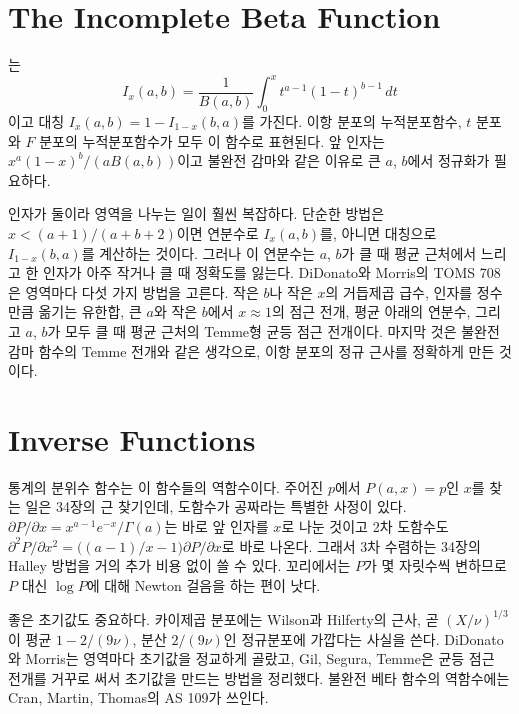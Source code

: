 \section{The Incomplete Beta Function}
\label{sec:incomplete-beta}

는
\[
I_x(a,b)=\frac1{B(a,b)}\int_0^xt^{a-1}(1-t)^{b-1}\,dt
\]
이고 대칭 $I_x(a,b)=1-I_{1-x}(b,a)$를 가진다. 이항 분포의 누적분포함수, $t$ 분포와 $F$ 분포의 누적분포함수가 모두 이 함수로 표현된다. 앞 인자는 $x^a(1-x)^b/(aB(a,b))$이고 불완전 감마와 같은 이유로 큰 $a$, $b$에서 정규화가 필요하다.

인자가 둘이라 영역을 나누는 일이 훨씬 복잡하다. 단순한 방법은 $x<(a+1)/(a+b+2)$이면 연분수로 $I_x(a,b)$를, 아니면 대칭으로 $I_{1-x}(b,a)$를 계산하는 것이다\cite{press2007nr}. 그러나 이 연분수는 $a$, $b$가 클 때 평균 근처에서 느리고 한 인자가 아주 작거나 클 때 정확도를 잃는다. DiDonato와 Morris의 TOMS 708은 영역마다 다섯 가지 방법을 고른다\cite{didonato1992}. 작은 $b$나 작은 $x$의 거듭제곱 급수, 인자를 정수만큼 옮기는 유한합, 큰 $a$와 작은 $b$에서 $x\approx1$의 점근 전개, 평균 아래의 연분수, 그리고 $a$, $b$가 모두 클 때 평균 근처의 Temme형 균등 점근 전개이다. 마지막 것은 불완전 감마 함수의 Temme 전개와 같은 생각으로, 이항 분포의 정규 근사를 정확하게 만든 것이다.

\section{Inverse Functions}
\label{sec:inverse-incomplete}

통계의 분위수 함수는 이 함수들의 역함수이다. 주어진 $p$에서 $P(a,x)=p$인 $x$를 찾는 일은 34장의 근 찾기인데, 도함수가 공짜라는 특별한 사정이 있다. $\partial P/\partial x=x^{a-1}e^{-x}/\Gamma(a)$는 바로 앞 인자를 $x$로 나눈 것이고 2차 도함수도 $\partial^2P/\partial x^2=\bigl((a-1)/x-1\bigr)\partial P/\partial x$로 바로 나온다. 그래서 3차 수렴하는 34장의 Halley 방법을 거의 추가 비용 없이 쓸 수 있다. 꼬리에서는 $P$가 몇 자릿수씩 변하므로 $P$ 대신 $\log P$에 대해 Newton 걸음을 하는 편이 낫다.

좋은 초기값도 중요하다. 카이제곱 분포에는 Wilson과 Hilferty의 근사, 곧 $(X/\nu)^{1/3}$이 평균 $1-2/(9\nu)$, 분산 $2/(9\nu)$인 정규분포에 가깝다는 사실을 쓴다\cite{wilson1931}. DiDonato와 Morris는 영역마다 초기값을 정교하게 골랐고\cite{didonato1986}, Gil, Segura, Temme은 균등 점근 전개를 거꾸로 써서 초기값을 만드는 방법을 정리했다\cite{gil2012igamma}. 불완전 베타 함수의 역함수에는 Cran, Martin, Thomas의 AS 109가 쓰인다\cite{cran1977}.


